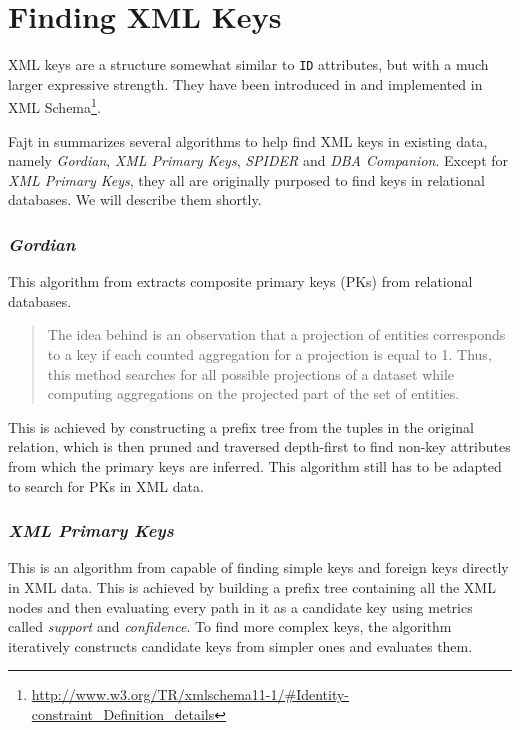 \section{Finding XML Keys}

XML keys are a structure somewhat similar to \texttt{ID} attributes, but with a much larger expressive strength. They have been introduced in \cite{keX} and implemented in XML Schema\footnote{\url{http://www.w3.org/TR/xmlschema11-1/\#Identity-constraint\_Definition\_details}}.

Fajt in \cite{fajt} summarizes several algorithms to help find XML keys in existing data, namely \textit{Gordian}, \textit{XML Primary Keys}, \textit{SPIDER} and \textit{DBA Companion}. Except for \textit{XML Primary Keys}, they all are originally purposed to find keys in relational databases. We will describe them shortly.

\subsubsection{\textit{Gordian}}

This algorithm from \cite{fajt-41} extracts composite primary keys (PKs) from relational databases.

\begin{quote}
The idea behind is an observation that a projection of entities corresponds to a key if each counted aggregation for a projection is equal to 1. Thus, this method searches for all possible projections of a dataset while computing aggregations on the projected part of the set of entities.
\end{quote}

This is achieved by constructing a prefix tree from the tuples in the original relation, which is then pruned and traversed depth-first to find non-key attributes from which the primary keys are inferred. This algorithm still has to be adapted to search for PKs in XML data.

\subsubsection{\textit{XML Primary Keys}}

This is an algorithm from \cite{fajt-39} capable of finding simple keys and foreign keys directly in XML data. This is achieved by building a prefix tree containing all the XML nodes and then evaluating every path in it as a candidate key using metrics called \textit{support} and \textit{confidence}. To find more complex keys, the algorithm iteratively constructs candidate keys from simpler ones and evaluates them.\\

